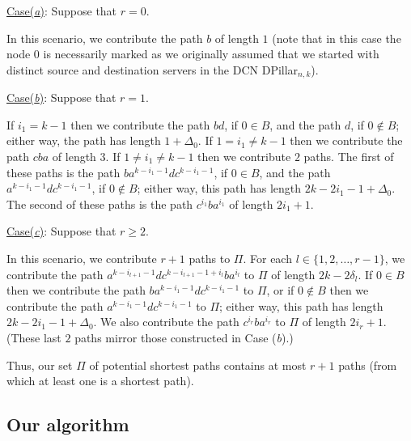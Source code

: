\documentclass{article}
\begin{document}
\noindent\underline{Case(\emph{a\/})}: Suppose that $r=0$.\smallskip

\noindent In this scenario, we contribute the path $b$ of length $1$ (note that in this case the node $0$ is necessarily marked as we originally assumed that we started with distinct source and destination servers in the DCN DPillar$_{n,k}$).\smallskip

\noindent\underline{Case(\emph{b\/})}: Suppose that $r=1$.\smallskip

\noindent If $i_1=k-1$ then we contribute the path $bd$, if $0\in B$, and the path $d$, if $0\not\in B$; either way, the path has length $1+\Delta_0$. If $1=i_1\neq k-1$ then we contribute the path $cba$ of length $3$. If $1\neq i_1 \neq k-1$ then we contribute $2$ paths. The first of these paths is the path $ba^{k-i_1-1}dc^{k-i_1-1}$, if $0\in B$, and the path $a^{k-i_1-1}dc^{k-i_1-1}$, if $0\not\in B$; either way, this path has length $2k-2i_1-1+\Delta_0$. The second of these paths is the path $c^{i_1}ba^{i_1}$ of length $2i_1+1$.\smallskip

\noindent\underline{Case(\emph{c\/})}: Suppose that $r\geq 2$.\smallskip

\noindent In this scenario, we contribute $r+1$ paths to $\Pi$. For each $l\in\{1,2,\ldots,r-1\}$, we contribute the path $a^{k-i_{l+1}-1} dc^{k-i_{l+1}-1+i_l}ba^{i_l}$ to $\Pi$ of length $2k-2\delta_l$. If $0\in B$ then we contribute the path $ba^{k-i_1-1}dc^{k-i_1-1}$ to $\Pi$, or if $0\not\in B$ then we contribute the path $a^{k-i_1-1}dc^{k-i_1-1}$ to $\Pi$; either way, this path has length $2k-2i_1-1+\Delta_0$. We also contribute the path $c^{i_r}ba^{i_r}$ to $\Pi$ of length $2i_r+1$. (These last $2$ paths mirror those constructed in Case (\emph{b\/}).)\smallskip

Thus, our set $\Pi$ of potential shortest paths contains at most $r+1$ paths (from which at least one is a shortest path).

\subsection{Our algorithm}
\end{document}

